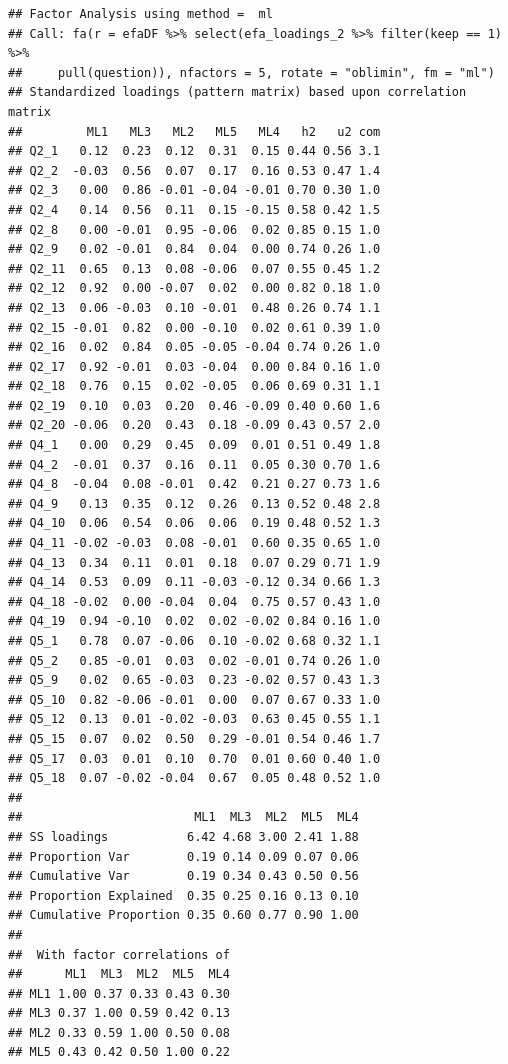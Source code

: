 \documentclass[
  man]{apa6}
\begin{document}
\begin{verbatim}
## Factor Analysis using method =  ml
## Call: fa(r = efaDF %>% select(efa_loadings_2 %>% filter(keep == 1) %>% 
##     pull(question)), nfactors = 5, rotate = "oblimin", fm = "ml")
## Standardized loadings (pattern matrix) based upon correlation matrix
##         ML1   ML3   ML2   ML5   ML4   h2   u2 com
## Q2_1   0.12  0.23  0.12  0.31  0.15 0.44 0.56 3.1
## Q2_2  -0.03  0.56  0.07  0.17  0.16 0.53 0.47 1.4
## Q2_3   0.00  0.86 -0.01 -0.04 -0.01 0.70 0.30 1.0
## Q2_4   0.14  0.56  0.11  0.15 -0.15 0.58 0.42 1.5
## Q2_8   0.00 -0.01  0.95 -0.06  0.02 0.85 0.15 1.0
## Q2_9   0.02 -0.01  0.84  0.04  0.00 0.74 0.26 1.0
## Q2_11  0.65  0.13  0.08 -0.06  0.07 0.55 0.45 1.2
## Q2_12  0.92  0.00 -0.07  0.02  0.00 0.82 0.18 1.0
## Q2_13  0.06 -0.03  0.10 -0.01  0.48 0.26 0.74 1.1
## Q2_15 -0.01  0.82  0.00 -0.10  0.02 0.61 0.39 1.0
## Q2_16  0.02  0.84  0.05 -0.05 -0.04 0.74 0.26 1.0
## Q2_17  0.92 -0.01  0.03 -0.04  0.00 0.84 0.16 1.0
## Q2_18  0.76  0.15  0.02 -0.05  0.06 0.69 0.31 1.1
## Q2_19  0.10  0.03  0.20  0.46 -0.09 0.40 0.60 1.6
## Q2_20 -0.06  0.20  0.43  0.18 -0.09 0.43 0.57 2.0
## Q4_1   0.00  0.29  0.45  0.09  0.01 0.51 0.49 1.8
## Q4_2  -0.01  0.37  0.16  0.11  0.05 0.30 0.70 1.6
## Q4_8  -0.04  0.08 -0.01  0.42  0.21 0.27 0.73 1.6
## Q4_9   0.13  0.35  0.12  0.26  0.13 0.52 0.48 2.8
## Q4_10  0.06  0.54  0.06  0.06  0.19 0.48 0.52 1.3
## Q4_11 -0.02 -0.03  0.08 -0.01  0.60 0.35 0.65 1.0
## Q4_13  0.34  0.11  0.01  0.18  0.07 0.29 0.71 1.9
## Q4_14  0.53  0.09  0.11 -0.03 -0.12 0.34 0.66 1.3
## Q4_18 -0.02  0.00 -0.04  0.04  0.75 0.57 0.43 1.0
## Q4_19  0.94 -0.10  0.02  0.02 -0.02 0.84 0.16 1.0
## Q5_1   0.78  0.07 -0.06  0.10 -0.02 0.68 0.32 1.1
## Q5_2   0.85 -0.01  0.03  0.02 -0.01 0.74 0.26 1.0
## Q5_9   0.02  0.65 -0.03  0.23 -0.02 0.57 0.43 1.3
## Q5_10  0.82 -0.06 -0.01  0.00  0.07 0.67 0.33 1.0
## Q5_12  0.13  0.01 -0.02 -0.03  0.63 0.45 0.55 1.1
## Q5_15  0.07  0.02  0.50  0.29 -0.01 0.54 0.46 1.7
## Q5_17  0.03  0.01  0.10  0.70  0.01 0.60 0.40 1.0
## Q5_18  0.07 -0.02 -0.04  0.67  0.05 0.48 0.52 1.0
## 
##                        ML1  ML3  ML2  ML5  ML4
## SS loadings           6.42 4.68 3.00 2.41 1.88
## Proportion Var        0.19 0.14 0.09 0.07 0.06
## Cumulative Var        0.19 0.34 0.43 0.50 0.56
## Proportion Explained  0.35 0.25 0.16 0.13 0.10
## Cumulative Proportion 0.35 0.60 0.77 0.90 1.00
## 
##  With factor correlations of 
##      ML1  ML3  ML2  ML5  ML4
## ML1 1.00 0.37 0.33 0.43 0.30
## ML3 0.37 1.00 0.59 0.42 0.13
## ML2 0.33 0.59 1.00 0.50 0.08
## ML5 0.43 0.42 0.50 1.00 0.22

\end{verbatim}
\end{document}

